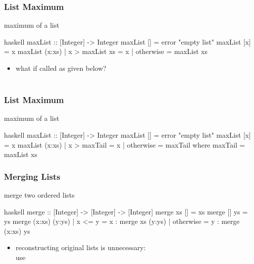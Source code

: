 \documentclass[dvipsnames]{beamer}
\theoremstyle{plain}
\begin{document}
\begin{frame}[fragile]
  \frametitle{List Maximum}

  \begin{exampleblock}{maximum of a list}
    \begin{pygments}{haskell}
maxList :: [Integer] -> Integer
maxList []     = error "empty list"
maxList [x]    = x
maxList (x:xs)
  | x > maxList xs = x
  | otherwise      = maxList xs
    \end{pygments}
  \end{exampleblock}

  \pause
  \begin{itemize}
    \item what if called as given below?\\
      \\
  \end{itemize}
\end{frame}

\begin{frame}[fragile]
  \frametitle{List Maximum}

  \begin{exampleblock}{maximum of a list}
    \begin{pygments}{haskell}
maxList :: [Integer] -> Integer
maxList []     = error "empty list"
maxList [x]    = x
maxList (x:xs)
  | x > maxTail = x
  | otherwise   = maxTail
  where maxTail = maxList xs
    \end{pygments}
  \end{exampleblock}
\end{frame}

\begin{frame}[fragile]
  \frametitle{Merging Lists}

  \begin{exampleblock}{merge two ordered lists}
    \begin{pygments}{haskell}
merge :: [Integer] -> [Integer] -> [Integer]
merge xs     []     = xs
merge []     ys     = ys
merge (x:xs) (y:ys)
  | x <= y    = x : merge xs (y:ys)
  | otherwise = y : merge (x:xs) ys
    \end{pygments}
  \end{exampleblock}

  \begin{itemize}
    \item reconstructing original lists is unnecessary:\\
      use 
  \end{itemize}
\end{frame}
\end{document}
